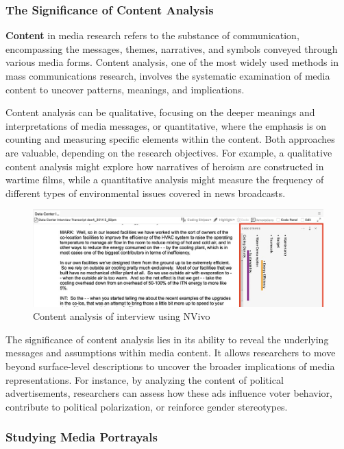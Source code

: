 \documentclass[
]{book}
\begin{document}
\subsubsection*{The Significance of Content Analysis}\label{the-significance-of-content-analysis}

\textbf{Content} in media research refers to the substance of communication, encompassing the messages, themes, narratives, and symbols conveyed through various media forms. Content analysis, one of the most widely used methods in mass communications research, involves the systematic examination of media content to uncover patterns, meanings, and implications.

Content analysis can be qualitative, focusing on the deeper meanings and interpretations of media messages, or quantitative, where the emphasis is on counting and measuring specific elements within the content. Both approaches are valuable, depending on the research objectives. For example, a qualitative content analysis might explore how narratives of heroism are constructed in wartime films, while a quantitative analysis might measure the frequency of different types of environmental issues covered in news broadcasts.

\begin{figure}
\centering
\includegraphics{images/fig01b.jpg}
\caption{Content analysis of interview using NVivo}
\end{figure}

The significance of content analysis lies in its ability to reveal the underlying messages and assumptions within media content. It allows researchers to move beyond surface-level descriptions to uncover the broader implications of media representations. For instance, by analyzing the content of political advertisements, researchers can assess how these ads influence voter behavior, contribute to political polarization, or reinforce gender stereotypes.

\subsubsection*{Studying Media Portrayals}\label{studying-media-portrayals}
\end{document}
